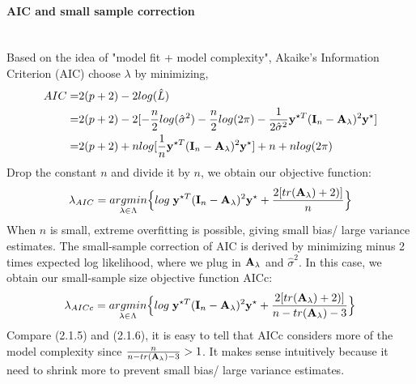\documentclass[11pt]{article}
\begin{document}
\paragraph{AIC and small sample correction}\mbox{}\\
Based on the idea of "model fit + model complexity", Akaike's Information Criterion (AIC) \citep{akaike_information_1998} choose $\lambda$ by minimizing,
\begin{align*}
AIC=&2(p+2)-2log(\hat{L})\\
=&2(p+2)-2[-\frac{n}{2}log (\hat{\sigma}^2)-\frac{n}{2}log (2\pi)-\frac{1}{2\hat{\sigma}^2}{\bf y}^{\star T}({\bf I}_n-{\bf A}_\lambda)^2{\bf y}^\star]\\
=&2(p+2)+n log[\frac{1}{n}{\bf y}^{\star T}({\bf I}_n-{\bf A}_\lambda)^2{\bf y}^\star]+n+n log(2\pi)
\end{align*}
Drop the constant $n$ and divide it by $n$, we obtain our objective function:
\begin{align}
\lambda_{AIC}=\underset{\lambda \in \Lambda}{argmin}\Big\{log\; {\bf y}^{\star T}({\bf I}_n-{\bf A}_\lambda)^2{\bf y}^\star+\frac{2[tr({\bf A}_\lambda)+2)]}{n}\Big\}
\end{align}
When $n$ is small, extreme overfitting is possible, giving small bias/ large variance estimates. The small-sample correction of AIC \citep{hurvich_regression_1989, hurvich_clifford_m._smoothing_2002} is derived by minimizing minus 2 times expected log likelihood, where we plug in ${\bf A}_\lambda$ and $\hat{\sigma}^2$. In this case, we obtain our small-sample size objective function AICc:
\begin{align}
\lambda_{AICc}=\underset{\lambda \in \Lambda}{argmin}\Big\{log\; {\bf y}^{\star T}({\bf I}_n-{\bf A}_\lambda)^2{\bf y}^\star+\frac{2[tr({\bf A}_\lambda)+2)]}{n-tr({\bf A}_\lambda)-3}\Big\}
\end{align}
Compare (2.1.5) and (2.1.6), it is easy to tell that AICc considers more of the model complexity since $\frac{n}{n-tr({\bf A}_\lambda)-3}>1$. It makes sense intuitively because it need to shrink more to prevent small bias/ large variance estimates.
\end{document}
